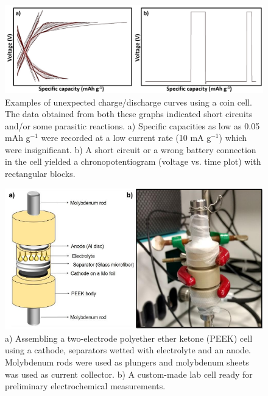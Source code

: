 \begin{figure}[tbh!]
\centering
\includegraphics[width=\textwidth]{Figures/chap3fig/weirdcdc}
\caption{Examples of unexpected charge/discharge curves using a coin cell. The data obtained from both these graphs indicated short circuits and/or some parasitic reactions. a) Specific capacities as low as 0.05 mAh g$^{-1}$ were recorded at a low current rate (10 mA g$^{-1}$) which were insignificant. b) A short circuit or a wrong battery connection in the cell yielded a chronopotentiogram (voltage vs. time plot) with rectangular blocks.}
\label{Figures/chap3fig:weirdcdc}
\end{figure}

\begin{figure}[tbh!]
\centering
\includegraphics[width=\textwidth]{Figures/chap3fig/swagelok.pdf}
\caption{a) Assembling a two-electrode polyether ether ketone (PEEK) cell using a cathode, separators wetted with electrolyte and an anode. Molybdenum rods were used as plungers and molybdenum sheets was used as current collector. b) A custom-made lab cell ready for preliminary electrochemical measurements.}
\label{Figures/chap3fig:swagelok}
\end{figure}

